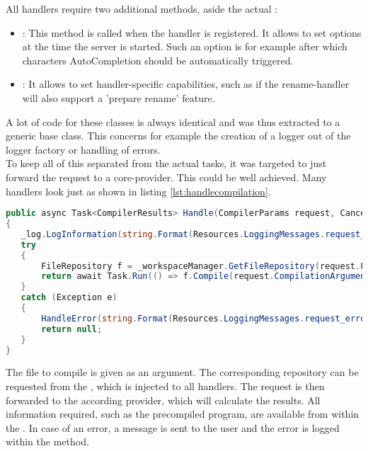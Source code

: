All handlers require two additional methods, aside the actual :
\begin{itemize}
    \item {}: This method is called when the handler is registered.
    It allows to set options at the time the server is started.
    Such an option is for example after which characters AutoCompletion should be automatically triggered.
    \item {}: It allows to set handler-specific capabilities, such as if the rename-handler will also support a 'prepare rename' feature.
\end{itemize}

A lot of code for these classes is always identical and was thus extracted to a generic base class.
This concerns for example the creation of a logger out of the logger factory or handling of errors.\\

To keep all of this separated from the actual tasks, it was targeted to just forward the request to a core-provider.
This could be well achieved.
Many handlers look just as shown in listing \ref{lst:handlecompilation}.

\begin{lstlisting}[language=csharp, caption={Handling Compilation}, captionpos=b, label={lst:handlecompilation}]
public async Task<CompilerResults> Handle(CompilerParams request, CancellationToken cancellationToken)
{
   _log.LogInformation(string.Format(Resources.LoggingMessages.request_handle, _method));
   try
   {
       FileRepository f = _workspaceManager.GetFileRepository(request.FileToCompile);
       return await Task.Run(() => f.Compile(request.CompilationArguments), cancellationToken);
   }
   catch (Exception e)
   {
       HandleError(string.Format(Resources.LoggingMessages.request_error, _method), e);
       return null;
   }
}
\end{lstlisting}

The file to compile is given as an argument.
The corresponding repository can be requested from the , which is injected to all handlers.
The request is then forwarded to the according provider, which will calculate the results.
All information required, such as the precompiled program, are available from within the .
In case of an error, a message is sent to the user and the error is logged within the  method.\\

